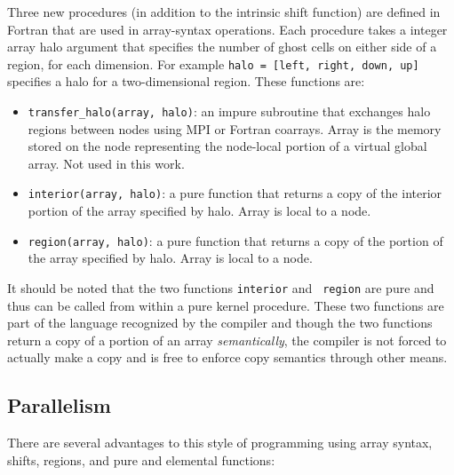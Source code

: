 Three new procedures (in addition to the intrinsic shift function) are
defined in Fortran that are used in array-syntax operations.  Each
procedure takes a integer array halo argument that specifies the
number of ghost cells on either side of a region, for each dimension.
For example {\tt halo = [left, right, down, up]} specifies a halo for
a two-dimensional region.  These functions are:
\begin{itemize}
   \item {\tt transfer\_halo(array, halo)}: an impure subroutine that
     exchanges halo regions between nodes using MPI or Fortran
     coarrays. Array is the memory stored on the node representing the
     node-local portion of a virtual global array. Not used in this work.
   \item {\tt interior(array, halo)}: a pure function that returns a copy of
     the interior portion of the array specified by halo. Array is
     local to a node.
   \item {\tt region(array, halo)}: a pure function that returns a copy of
     the portion of the array specified by halo.  Array is local to a node.
\end{itemize}

It should be noted that the two functions {\tt interior} and {\tt
  region} are pure and thus can be called from within a pure kernel
procedure.  These two functions are part of the language recognized by
the compiler and though the two functions return a copy of a portion
of an array \emph{semantically}, the compiler is not forced to
actually make a copy and is free to enforce copy semantics through
other means.

\subsection{Parallelism}





There are several advantages to this style of programming using array syntax, shifts, regions,
and pure and elemental functions:

